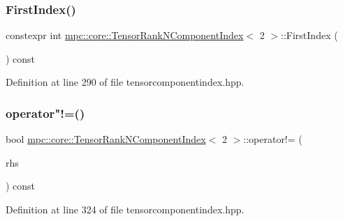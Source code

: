 \subsubsection{\texorpdfstring{First\+Index()}{FirstIndex()}}
{\footnotesize\ttfamily constexpr int \mbox{\hyperlink{classmpc_1_1core_1_1_tensor_rank_n_component_index}{mpc\+::core\+::\+Tensor\+Rank\+N\+Component\+Index}}$<$ 2 $>$\+::First\+Index (\begin{DoxyParamCaption}{ }\end{DoxyParamCaption}) const\hspace{0.3cm}{\ttfamily [inline]}}



Definition at line 290 of file tensorcomponentindex.\+hpp.

\mbox{\label{classmpc_1_1core_1_1_tensor_rank_n_component_index_3_012_01_4_a966dfbb52b3436ba0c2b7e77e8b0114f}} 
\subsubsection{\texorpdfstring{operator"!=()}{operator!=()}}
{\footnotesize\ttfamily bool \mbox{\hyperlink{classmpc_1_1core_1_1_tensor_rank_n_component_index}{mpc\+::core\+::\+Tensor\+Rank\+N\+Component\+Index}}$<$ 2 $>$\+::operator!= (\begin{DoxyParamCaption}\item[{const \mbox{\hyperlink{classmpc_1_1core_1_1_tensor_rank_n_component_index}{Tensor\+Rank\+N\+Component\+Index}}$<$ 2 $>$ \&}]{rhs }\end{DoxyParamCaption}) const\hspace{0.3cm}{\ttfamily [inline]}}



Definition at line 324 of file tensorcomponentindex.\+hpp.

\mbox{\label{classmpc_1_1core_1_1_tensor_rank_n_component_index_3_012_01_4_affa9968262b55f95c8008607b279935a}} 
